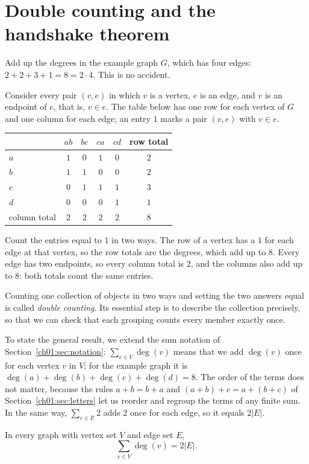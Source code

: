 \section{Double counting and the handshake theorem}\label{ch07:sec:double}
Add up the degrees in the example graph $G$, which has four edges: $2+2+3+1=8=2\cdot4$. This is no accident.

Consider every pair $(v,e)$ in which $v$ is a vertex, $e$ is an edge, and $v$ is an endpoint of $e$, that is, $v\in e$. The table below has one row for each vertex of $G$ and one column for each edge; an entry $1$ marks a pair $(v,e)$ with $v\in e$.
\begin{center}
\begin{tabular}{@{}lccccc@{}}
\toprule
 & $ab$ & $bc$ & $ca$ & $cd$ & row total\\
\midrule
$a$ & $1$ & $0$ & $1$ & $0$ & $2$\\
$b$ & $1$ & $1$ & $0$ & $0$ & $2$\\
$c$ & $0$ & $1$ & $1$ & $1$ & $3$\\
$d$ & $0$ & $0$ & $0$ & $1$ & $1$\\
\midrule
column total & $2$ & $2$ & $2$ & $2$ & $8$\\
\bottomrule
\end{tabular}
\end{center}
Count the entries equal to $1$ in two ways. The row of a vertex has a $1$ for each edge at that vertex, so the row totals are the degrees, which add up to $8$. Every edge has two endpoints, so every column total is $2$, and the columns also add up to $8$: both totals count the same entries.

Counting one collection of objects in two ways and setting the two answers equal is called \emph{double counting}. Its essential step is to describe the collection precisely, so that we can check that each grouping counts every member exactly once.

To state the general result, we extend the sum notation of Section~\ref{ch01:sec:notation}: $\sum_{v\in V}\deg(v)$ means that we add $\deg(v)$ once for each vertex $v$ in $V$; for the example graph it is $\deg(a)+\deg(b)+\deg(c)+\deg(d)=8$. The order of the terms does not matter, because the rules $a+b=b+a$ and $(a+b)+c=a+(b+c)$ of Section~\ref{ch01:sec:letters} let us reorder and regroup the terms of any finite sum. In the same way, $\sum_{e\in E}2$ adds $2$ once for each edge, so it equals $2|E|$.

\par\noindent\begin{minipage}{\linewidth}
\begin{theorem}\label{thm:handshake}
In every graph with vertex set $V$ and edge set $E$,
\[
\sum_{v\in V}\deg(v)=2|E|.
\]
\end{theorem}
\end{minipage}\par

